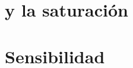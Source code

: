






\section{\texorpdfstring{\stoodx}{STOOD-X} y la saturación}\label{sec:apd-stoodx}




\section{Sensibilidad}\label{sec:apd-sensibilidad}

